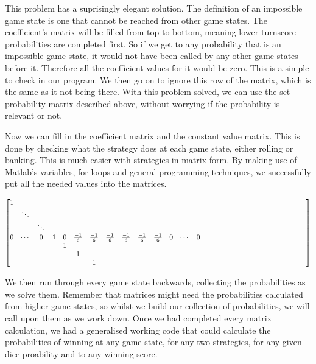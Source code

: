 \documentclass[a4paper,titlepage]{article}
\begin{document}
This problem has a suprisingly elegant solution. The definition of an impossible game state is one that cannot be reached from other game states. The coefficient's matrix will be filled from top to bottom, meaning lower turnscore probabilities are completed first. So if we get to any probability that is an impossible game state, it would not have been called by any other game states before it. Therefore all the coefficient values for it would be zero. This is a simple to check in our program. We then go on to ignore this row of the matrix, which is the same as it not being there. With this problem solved, we can use the set probability matrix described above, without worrying if the probability is relevant or not.

Now we can fill in the coefficient matrix and the constant value matrix. This is done by checking what the strategy does at each game state, either rolling or banking. This is much easier with strategies in matrix form. By making use of Matlab's variables, for loops and general programming techniques, we successfully put all the needed values into the matrices.

\begin{align*}
	\setcounter{MaxMatrixCols}{40}
	\begin{bmatrix}
		  1 &&&&&&&&&&&&&&&&&&&&&&&&&&\\
		  & \ddots &&&&&&&&&&&&&&&&&&&&&&&&&&&\\
		  && \ddots &&&&&&&&&&&&&&&&&&&&&&&&&&\\
		  0 & \cdots & 0 & 1 & 0 & \frac{-1}{6} & \frac{-1}{6} & \frac{-1}{6} & \frac{-1}{6} & \frac{-1}{6} & \frac{-1}{6}  & 0 & \cdots & 0 \\
		    &   &   &   & 1 &&&&&&&&&&&&&&&&&&&&&&&\\
		    &   &   &   &   & 1 &&&&&&&&&&&&&&&&&&&&&& \\
		    &   &   &   &   &   & 1 &&&&&&&&&&&&&&&&&&&&&& \\
	\end{bmatrix}
\end{align*}

We then run through every game state backwards, collecting the probabilities as we solve them. Remember that matrices might need the probabilities calculated from higher game states, so whilst we build our collection of probabilities, we will call upon them as we work down. Once we had completed every matrix calculation, we had a generalised working code that could calculate the probabilities of winning at any game state, for any two strategies, for any given dice proability and to any winning score.
\end{document}
